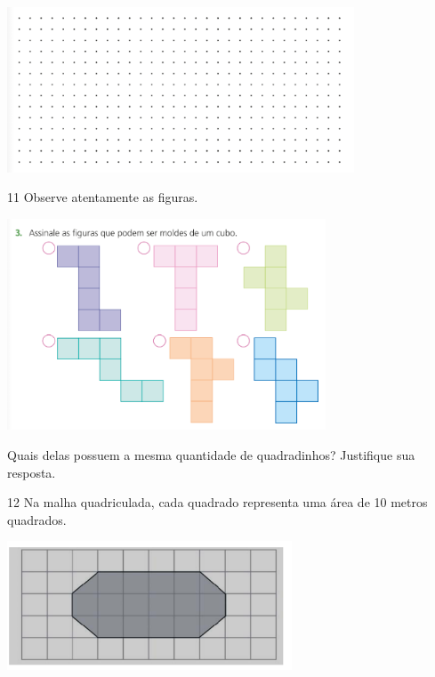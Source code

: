
\includegraphics[width=4.05869in,height=1.93350in]{./media/image58.png}


\num{11} Observe atentamente as figuras.


\includegraphics[width=3.72532in,height=2.47521in]{./media/image59.png}

Quais delas possuem a mesma quantidade de quadradinhos? Justifique sua resposta.


\num{12} Na malha quadriculada, cada quadrado representa uma área de 10 metros quadrados.


\includegraphics[width=3.33333in,height=1.50517in]{./media/image60.png}

